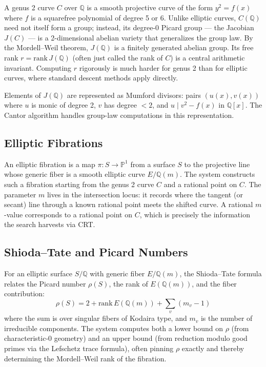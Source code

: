 \documentclass[11pt, a4paper]{article}
\begin{document}
A genus 2 curve $C$ over $\mathbb{Q}$ is a smooth projective curve of the form $y^2 = f(x)$ where $f$ is a squarefree polynomial of degree 5 or 6. Unlike elliptic curves, $C(\mathbb{Q})$ need not itself form a group; instead, its degree-0 Picard group --- the Jacobian $J(C)$ --- is a 2-dimensional abelian variety that generalizes the group law. By the Mordell--Weil theorem, $J(\mathbb{Q})$ is a finitely generated abelian group. Its free rank $r = \text{rank}\, J(\mathbb{Q})$ (often just called the rank of $C$) is a central arithmetic invariant. Computing $r$ rigorously is much harder for genus 2 than for elliptic curves, where standard descent methods apply directly.

Elements of $J(\mathbb{Q})$ are represented as Mumford divisors: pairs $(u(x), v(x))$ where $u$ is monic of degree 2, $v$ has degree $< 2$, and $u \mid v^2 - f(x)$ in $\mathbb{Q}[x]$. The Cantor algorithm handles group-law computations in this representation.

\subsection{Elliptic Fibrations}

An elliptic fibration is a map $\pi: S \to \mathbb{P}^1$ from a surface $S$ to the projective line whose generic fiber is a smooth elliptic curve $E/\mathbb{Q}(m)$. The system constructs such a fibration starting from the genus 2 curve $C$ and a rational point on $C$. The parameter $m$ lives in the intersection locus: it records where the tangent (or secant) line through a known rational point meets the shifted curve. A rational $m$-value corresponds to a rational point on $C$, which is precisely the information the search harvests via CRT.

\subsection{Shioda--Tate and Picard Numbers}

For an elliptic surface $S/\mathbb{Q}$ with generic fiber $E/\mathbb{Q}(m)$, the Shioda--Tate formula relates the Picard number $\rho(S)$, the rank of $E(\mathbb{Q}(m))$, and the fiber contribution:
$$\rho(S) = 2 + \text{rank}\, E(\mathbb{Q}(m)) + \sum_v (m_v - 1)$$
where the sum is over singular fibers of Kodaira type, and $m_v$ is the number of irreducible components. The system computes both a lower bound on $\rho$ (from characteristic-0 geometry) and an upper bound (from reduction modulo good primes via the Lefschetz trace formula), often pinning $\rho$ exactly and thereby determining the Mordell--Weil rank of the fibration.
\end{document}
